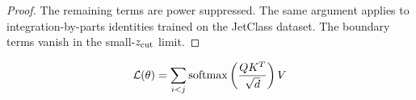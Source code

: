 \begin{proof}
The remaining terms are power suppressed. The same argument applies to
integration-by-parts identities trained on the JetClass dataset. The
boundary terms vanish in the small-$z_{\rm cut}$ limit.
\end{proof}

\begin{equation}
  \mathcal{L}(\theta) = \sum_{i<j} \mathrm{softmax}\left(\frac{Q K^T}{\sqrt{d}}\right) V
  \label{eq:7}
\end{equation}

